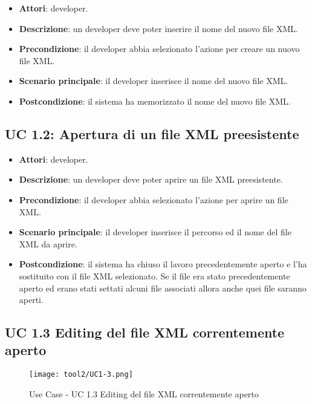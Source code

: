 		\begin{itemize}
			\item\textbf{Attori}: developer.
			\item\textbf{Descrizione}: un developer deve poter inserire il nome del nuovo file XML.
			\item\textbf{Precondizione}: il developer abbia selezionato l'azione per creare un nuovo file XML.
			\item\textbf{Scenario principale}: il developer inserisce il nome del nuovo file XML.
			\item\textbf{Postcondizione}: il sistema ha memorizzato il nome del nuovo file XML.
		\end{itemize}
		
	\subsection{UC 1.2: Apertura di un file XML preesistente}
		\label{subsec:XEUC1.2}
		
		\begin{itemize}
			\item\textbf{Attori}: developer.
			\item\textbf{Descrizione}: un developer deve poter aprire un file XML preesistente.
			\item\textbf{Precondizione}: il developer abbia selezionato l'azione per aprire un file XML.
			\item\textbf{Scenario principale}: il developer inserisce il percorso ed il nome del file XML da aprire.
			\item\textbf{Postcondizione}: il sistema ha chiuso il lavoro precedentemente aperto e l'ha sostituito con il file XML selezionato. Se il file era stato precedentemente aperto ed erano stati settati alcuni file associati allora anche quei file saranno aperti.
		\end{itemize}
		
	\subsection{UC 1.3 Editing del file XML correntemente aperto}
		\label{subsec:XEUC1.3}
		
		\begin{figure}[!h] 
			\centering 
			\texttt{[image: tool2/UC1-3.png]} 
			\caption{Use Case - UC 1.3 Editing del file XML correntemente aperto}
		\end{figure}
		
